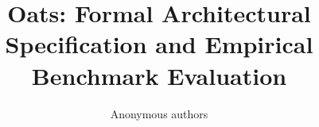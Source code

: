 \title{\textbf{Oats: Formal Architectural Specification and Empirical Benchmark Evaluation}}

\author{Anonymous authors}
